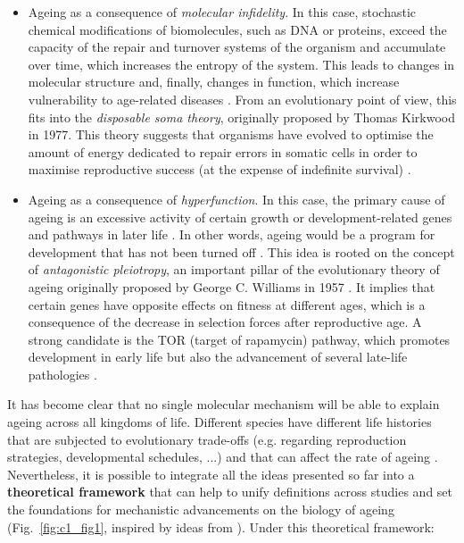 \begin{itemize}
	
	\item Ageing as a consequence of \textit{molecular infidelity}. In this case, stochastic chemical modifications of biomolecules, such as DNA or proteins, exceed the capacity of the repair and turnover systems of the organism and accumulate over time, which increases the entropy of the system. This leads to changes in molecular structure and, finally, changes in function, which increase vulnerability to age-related diseases \cite{Hayflick2007,Hayflick2007a}. From an evolutionary point of view, this fits into the \textit{disposable soma theory}, originally proposed by Thomas Kirkwood in 1977. This theory suggests that organisms have evolved to optimise the amount of energy dedicated to repair errors in somatic cells in order to maximise reproductive success (at the expense of indefinite survival) \cite{Kirkwood1977,Kirkwood1991}. 
	
	\item Ageing as a consequence of \textit{hyperfunction}. In this case, the primary cause of ageing is an excessive activity of certain growth or development-related genes and pathways in later life \cite{Blagosklonny2006,Blagosklonny2010,DeMagalhaes2012,Gems2015}. In other words, ageing would be a program for development that has not been turned off \cite{Blagosklonny2006}. This idea is rooted on the concept of \textit{antagonistic pleiotropy}, an important pillar of the evolutionary theory of ageing originally proposed by George C. Williams in 1957 \cite{Williams1957}. It implies that certain genes have opposite effects on fitness at different ages, which is a consequence of the decrease in selection forces after reproductive age. A strong candidate is the \acrshort{TOR} (target of rapamycin) pathway, which promotes development in early life but also the advancement of several late-life pathologies \cite{Blagosklonny2010}. 
	
\end{itemize}

It has become clear that no single molecular mechanism will be able to explain ageing across all kingdoms of life. Different species have different life histories that are subjected to evolutionary trade-offs (e.g. regarding reproduction strategies, developmental schedules, ...) and that can affect the rate of ageing \cite{Ricklefs2010,Jones2013}. Nevertheless, it is possible to integrate all the ideas presented so far into a \textbf{theoretical framework} that can help to unify definitions across studies and set the foundations for mechanistic advancements on the biology of ageing (Fig.~\ref{fig:c1_fig1}, inspired by ideas from \cite{Hayflick2007,Gems2015,Peto1997,Freund2019}). Under this theoretical framework: 

